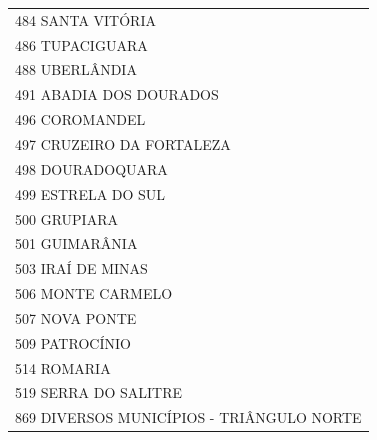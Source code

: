 \documentclass{article}
\begin{document}
\begin{longtable}[c]{m{18cm}}
\multicolumn{1}{l}{ \hspace{2em} 484 SANTA VITÓRIA } \\
\multicolumn{1}{l}{ \hspace{2em} 486 TUPACIGUARA } \\
\multicolumn{1}{l}{ \hspace{2em} 488 UBERLÂNDIA } \\
\multicolumn{1}{l}{ \hspace{2em} 491 ABADIA DOS DOURADOS } \\
\multicolumn{1}{l}{ \hspace{2em} 496 COROMANDEL } \\
\multicolumn{1}{l}{ \hspace{2em} 497 CRUZEIRO DA FORTALEZA } \\
\multicolumn{1}{l}{ \hspace{2em} 498 DOURADOQUARA } \\
\multicolumn{1}{l}{ \hspace{2em} 499 ESTRELA DO SUL } \\
\multicolumn{1}{l}{ \hspace{2em} 500 GRUPIARA } \\
\multicolumn{1}{l}{ \hspace{2em} 501 GUIMARÂNIA } \\
\multicolumn{1}{l}{ \hspace{2em} 503 IRAÍ DE MINAS } \\
\multicolumn{1}{l}{ \hspace{2em} 506 MONTE CARMELO } \\
\multicolumn{1}{l}{ \hspace{2em} 507 NOVA PONTE } \\
\multicolumn{1}{l}{ \hspace{2em} 509 PATROCÍNIO } \\
\multicolumn{1}{l}{ \hspace{2em} 514 ROMARIA } \\
\multicolumn{1}{l}{ \hspace{2em} 519 SERRA DO SALITRE } \\
\multicolumn{1}{l}{ \hspace{2em} 869 DIVERSOS MUNICÍPIOS - TRIÂNGULO NORTE } \\
\end{longtable}
\newpage
\end{document}
